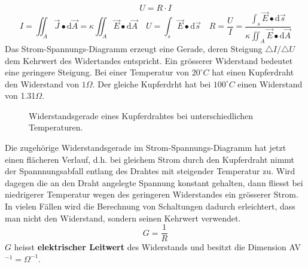 \begin{equation}
\boxed{U=R\cdot I}
\end{equation}
\begin{equation}
\boxed{I=\displaystyle \iint_{A}\overrightarrow{J}\bullet\text{d}\overrightarrow{A}=\kappa\displaystyle \iint_{A}\overrightarrow{E}\bullet \text{d}\overrightarrow{A}}\quad \boxed{U=\displaystyle \int_s\overrightarrow{E}\bullet \text{d}\overrightarrow{s}}\quad \boxed{R=\dfrac{U}{I}=\dfrac{\displaystyle \int_s\overrightarrow{E}\bullet \text{d}\overrightarrow{s}}{\kappa\displaystyle \iint_{A}\overrightarrow{E}\bullet \text{d}\overrightarrow{A}}}
\end{equation}
Das Strom-Spannungs-Diagramm erzeugt eine Gerade, deren Steigung $\triangle I/\triangle U$ dem Kehrwert des Widertandes entspricht. Ein grösserer Widerstand bedeutet eine geringere Steigung. Bei einer Temperatur von $20^{\circ}C$ hat einen Kupferdraht den Widerstand von $1\Omega$. Der gleiche Kupferdrht hat bei $100^{\circ}C$ einen Widerstand von 1.31$\Omega$.
\begin{figure}[H]
\centering
\caption{Widerstandsgerade eines Kupferdrahtes bei unterschiedlichen Temperaturen.}
\label{fig_IIf}
\end{figure}
\noindent Die zugehörige Widerstandsgerade im Strom-Spannungs-Diagramm hat jetzt einen flächeren Verlauf, d.h. bei gleichem Strom durch den Kupferdraht nimmt der Spannnungsabfall entlang des Drahtes mit steigender Temperatur zu. Wird dagegen die an den Draht angelegte Spannung konstant gehalten, dann fliesst bei niedrigerer Temperatur wegen des geringeren Widerstandes ein grösserer Strom.
\newline\newline
In vielen Fällen wird die Berechnung von Schaltungen dadurch erleichtert, dass man nicht den Widerstand, sondern seinen Kehrwert verwendet. 
\begin{equation} 
\boxed{G=\dfrac{1}{R}}
\end{equation}
$G$ heisst \textbf{elektrischer Leitwert} des Widerstands und besitzt die Dimension AV$^{-1}=\Omega^{-1}$.
